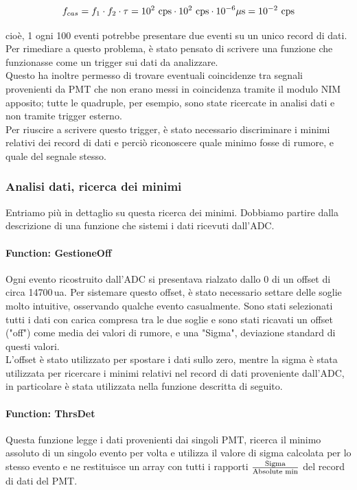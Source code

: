 \documentclass[a4paper,twocolumn]{article}
\begin{document}
\begin{equation}
f_{cas} = f_1 \cdot f_2 \cdot \tau = 10^2 \textnormal{ cps} \cdot 10^2\textnormal{ cps} \cdot 10^{-6} \space \mu\textnormal{s} = 10^{-2} \textnormal{ cps}
\end{equation}

cioè, 1 ogni 100 eventi potrebbe presentare due eventi su un unico record di dati.\\
Per rimediare a questo problema, è stato pensato di scrivere una funzione che funzionasse come un trigger sui dati da analizzare.\\
Questo ha inoltre permesso di trovare eventuali coincidenze tra segnali provenienti da PMT che non erano messi in coincidenza tramite il modulo NIM apposito; tutte le quadruple, per esempio, sono state ricercate in analisi dati e non tramite trigger esterno.\\
Per riuscire a scrivere questo trigger, è stato necessario discriminare i minimi relativi dei record di dati e perciò riconoscere quale minimo fosse di rumore, e quale del segnale stesso.

\subsubsection{Analisi dati, ricerca dei minimi}
\label{sec:AThreshold}
Entriamo più in dettaglio su questa ricerca dei minimi. Dobbiamo partire dalla descrizione di una funzione che sistemi i dati ricevuti dall'ADC.
\paragraph{Function: GestioneOff}
Ogni evento ricostruito dall'ADC si presentava rialzato dallo 0 di un offset di circa 14700\,ua. Per sistemare questo offset, è stato necessario settare delle soglie molto intuitive, osservando qualche evento casualmente. Sono stati selezionati tutti i dati con carica compresa tra le due soglie e sono stati ricavati un offset ("off") come media dei valori di rumore, e una "Sigma", deviazione standard di questi valori.\\
L'offset è stato utilizzato per spostare i dati sullo zero, mentre la sigma è stata utilizzata per ricercare i minimi relativi nel record di dati proveniente dall'ADC, in particolare è stata utilizzata nella funzione descritta di seguito.
\paragraph{Function: ThrsDet}
Questa funzione legge i dati provenienti dai singoli PMT, ricerca il minimo assoluto di un singolo evento per volta e utilizza il valore di sigma calcolata per lo stesso evento e ne restituisce un array con tutti i rapporti $\frac{\textnormal{Sigma}}{\textnormal{Absolute min}}$ del record di dati del PMT.
\end{document}
